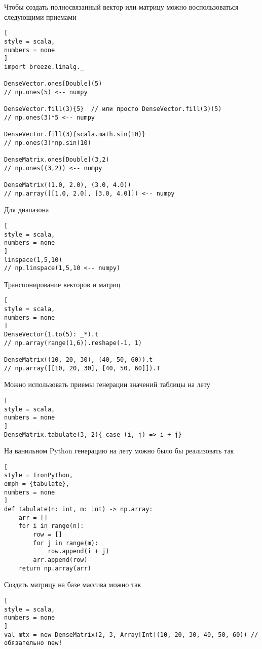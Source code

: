 \documentclass[%
	11pt,
	a4paper,
	utf8,
		]{article}
\begin{document}
Чтобы создать полносвязанный вектор или матрицу можно воспользоваться следующими приемами
\begin{lstlisting}[
style = scala,
numbers = none	
]
import breeze.linalg._

DenseVector.ones[Double](5) 
// np.ones(5) <-- numpy

DenseVector.fill(3){5}  // или просто DenseVector.fill(3)(5)
// np.ones(3)*5 <-- numpy

DenseVector.fill(3){scala.math.sin(10)}
// np.ones(3)*np.sin(10)

DenseMatrix.ones[Double](3,2)
// np.ones((3,2)) <-- numpy

DenseMatrix((1.0, 2.0), (3.0, 4.0))
// np.array([[1.0, 2.0], [3.0, 4.0]]) <-- numpy
\end{lstlisting}

Для диапазона
\begin{lstlisting}[
style = scala,
numbers = none	
]
linspace(1,5,10)
// np.linspace(1,5,10 <-- numpy)
\end{lstlisting}

Транспонирование векторов и матриц
\begin{lstlisting}[
style = scala,
numbers = none	
]
DenseVector(1.to(5): _*).t
// np.array(range(1,6)).reshape(-1, 1)

DenseMatrix((10, 20, 30), (40, 50, 60)).t
// np.array([[10, 20, 30], [40, 50, 60]]).T
\end{lstlisting}

Можно использовать приемы генерации значений таблицы на лету
\begin{lstlisting}[
style = scala,
numbers = none	
]
DenseMatrix.tabulate(3, 2){ case (i, j) => i + j}
\end{lstlisting}

На ванильном Python генерацию на лету можно было бы реализовать так
\begin{lstlisting}[
style = IronPython,
emph = {tabulate},
numbers = none	
]
def tabulate(n: int, m: int) -> np.array:
    arr = []
    for i in range(n):
        row = []
        for j in range(m):
            row.append(i + j)
        arr.append(row)
    return np.array(arr)
\end{lstlisting}

Создать матрицу на базе массива можно так
\begin{lstlisting}[
style = scala,
numbers = none	
]
val mtx = new DenseMatrix(2, 3, Array[Int](10, 20, 30, 40, 50, 60)) // обязательно new!
\end{lstlisting}
\end{document}
